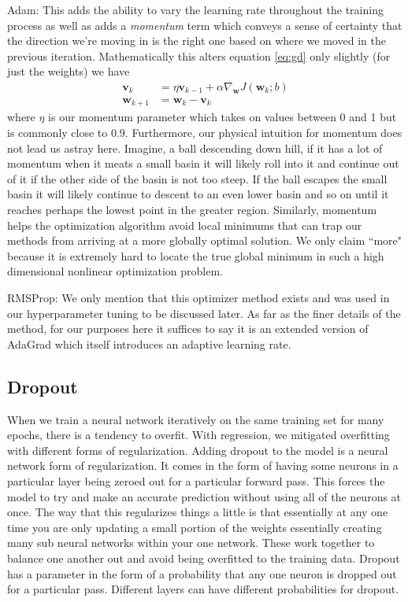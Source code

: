 \documentclass[10pt]{amsart}
\begin{document}
Adam: 
This adds the ability to vary the learning rate throughout the training process as well as adds a \textit{momentum} term which conveys a sense of certainty that the direction we're moving in is the right one based on where we moved in the previous iteration.
Mathematically this alters equation \eqref{eq:gd} only slightly (for just the weights) we have
\begin{equation}
\begin{split}
\bm v_k &= \eta \bm v_{k-1}  + \alpha \nabla_{\bm w} J(\bm w_{k}; b) \\
\bm w_{k + 1} &= \bm w_{k} - \bm v_k
\end{split}
\end{equation}
where $\eta$ is our momentum parameter which takes on values between 0 and 1 but is commonly close to $0.9$.
Furthermore, our physical intuition for momentum does not lead us astray here.
Imagine, a ball descending down hill, if it has a lot of momentum when it meats a small basin it will likely roll into it and continue out of it if the other side of the basin is not too steep.
If the ball escapes the small basin it will likely continue to descent to an even lower basin and so on until it reaches perhaps the lowest point in the greater region.
Similarly, momentum helps the optimization algorithm avoid local minimums that can trap our methods from arriving at a more globally optimal solution.
We only claim ``more" because it is extremely hard to locate the true global minimum in such a high dimensional nonlinear optimization problem.

RMSProp:
We only mention that this optimizer method exists and was used in our hyperparameter tuning to be discussed later.
As far as the finer details of the method, for our purposes here it suffices to say it is an extended version of AdaGrad which itself introduces an adaptive learning rate.

\subsection{Dropout}
When we train a neural network iteratively on the same training set for many epochs, there is a tendency to overfit.
With regression, we mitigated overfitting with different forms of regularization.
Adding dropout to the model is a neural network form of regularization.
It comes in the form of having some neurons in a particular layer being zeroed out for a particular forward pass.
This forces the model to try and make an accurate prediction without using all of the neurons at once.
The way that this regularizes things a little is that essentially at any one time you are only updating a small portion of the weights essentially creating many sub neural networks within your one network.
These work together to balance one another out and avoid being overfitted to the training data.
Dropout has a parameter in the form of a probability that any one neuron is dropped out for a particular pass.
Different layers can have different probabilities for dropout.
\end{document}
